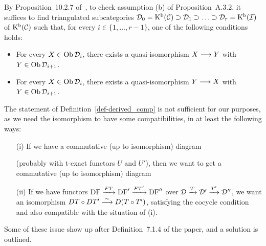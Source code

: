 \begin{remark}
By Proposition~10.2.7 of~\cite{KS1}, to check assumption (b) of Proposition~A.3.2, it suffices to find triangulated subcategories
$\mathcal{D}_0=\operatorname{\mathrm{K}^b}(\mathcal{C})\supset\mathcal{D}_1\supset\ldots\supset\mathcal{D}_r=\operatorname{\mathrm{K}^b}(\mathcal{I})$ of $\operatorname{\mathrm{K}^b}(\mathcal{C})$ such that, for every $i\in\{1,\ldots,r-1\}$, one of the following conditions holds:
\begin{itemize}
\item For every $X\in\operatorname{\mathrm{Ob}}\mathcal{D}_i$, there exists a quasi-isomorphism $X\longrightarrow Y$ with $Y\in\operatorname{\mathrm{Ob}}\mathcal{D}_{i+1}$.
\item For every $X\in\operatorname{\mathrm{Ob}}\mathcal{D}_i$, there exists a quasi-isomorphism $Y\longrightarrow X$ with $Y\in\operatorname{\mathrm{Ob}}\mathcal{D}_{i+1}$.

\end{itemize}

\label{rmk_der_fil2}
\end{remark}

\begin{remark}
The statement of Definition~\ref{def-derived_comp} is not sufficient for our purposes, as we 
need the isomorphism to have some compatibilities, in at least the following ways:
\begin{itemize}
\item[(i)] If we have a commutative (up to isomorphism) diagram 
(probably with t-exact functors $U$ and $U'$),
then we want to get a commutative (up to isomorphism) diagram

\item[(ii)] If we have functors $\operatorname{DF}\xrightarrow{FT}\operatorname{DF}'\xrightarrow{FT'}\operatorname{DF}''$ over $\mathcal{D}\xrightarrow{T}\mathcal{D}'\xrightarrow{T'}\mathcal{D}''$,
we want an isomorphism $DT\circ DT'\stackrel{\sim}{\longrightarrow} D(T\circ T')$, satisfying the cocycle condition and also
compatible with the situation of (i).

\end{itemize}

Some of these issue show up after Definition~7.1.4 of the paper, and a solution is outlined.

\end{remark}
